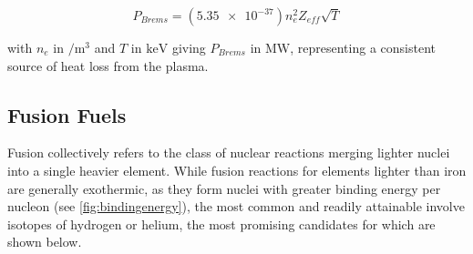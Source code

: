 \begin{equation}\label{eq:brems}
 P_{Brems} = \left( \num{5.35e-37} \right) n_e^2 Z_{eff} \sqrt{T}
\end{equation}

\noindent with $n_e$ in $\si{\per\meter\cubed}$ and $T$ in $\si{\kilo\electronvolt}$ giving $P_{Brems}$ in $\si{\mega\watt}$, representing a consistent source of heat loss from the plasma.

\subsection{Fusion Fuels}\label{subsec:intro_fuels}

Fusion collectively refers to the class of nuclear reactions merging lighter nuclei into a single heavier element.  While fusion reactions for elements lighter than iron are generally exothermic, as they form nuclei with greater binding energy per nucleon (see \cref{fig:bindingenergy}), the most common and readily attainable involve isotopes of hydrogen or helium, the most promising candidates for which are shown below.

\begin{figure}[t]
 \pushtooutside
\end{figure}

